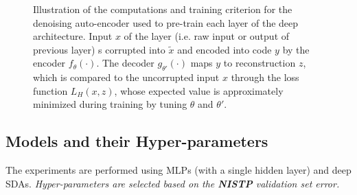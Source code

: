\documentclass{article} %
\begin{document}
\begin{figure}[ht]
\centerline{}
\caption{Illustration of the computations and training criterion for the denoising
auto-encoder used to pre-train each layer of the deep architecture. Input $x$ of
the layer (i.e. raw input or output of previous layer)
s corrupted into $\tilde{x}$ and encoded into code $y$ by the encoder $f_\theta(\cdot)$.
The decoder $g_{\theta'}(\cdot)$ maps $y$ to reconstruction $z$, which
is compared to the uncorrupted input $x$ through the loss function
$L_H(x,z)$, whose expected value is approximately minimized during training
by tuning $\theta$ and $\theta'$.}
\label{fig:da}
\end{figure}

\subsection{Models and their Hyper-parameters}

The experiments are performed using MLPs (with a single
hidden layer) and deep SDAs.
\emph{Hyper-parameters are selected based on the {\bf NISTP} validation set error.}
\end{document}
